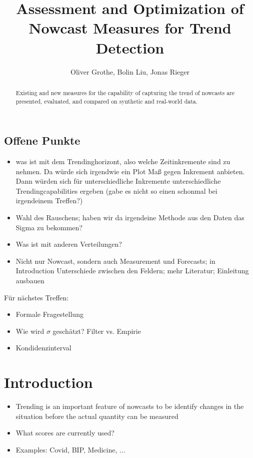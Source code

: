 \documentclass[oneside]{article}
\title{Assessment and Optimization of Nowcast Measures for Trend Detection}
\author{Oliver Grothe, Bolin Liu, Jonas Rieger}
\theoremstyle{plain}%
\theoremstyle{definition}
\begin{document}
\maketitle

\begin{abstract}
Existing and new measures for the capability of capturing the trend of nowcasts are presented, evaluated, and compared on synthetic and real-world data.
\end{abstract}

\subsection*{Offene Punkte}

\begin{itemize}
    \item was ist mit dem Trendinghorizont, also welche Zeitinkremente sind zu nehmen. Da würde sich irgendwie ein Plot Maß gegen Inkrement anbieten. Dann würden sich für unterschiedliche Inkremente unterschiedliche Trendingcapabilities ergeben (gabe es nicht so einen schonmal bei irgendeinem Treffen?)
    \item Wahl des Rauschens; haben wir da irgendeine Methode aus den Daten das Sigma zu bekommen?
    \item Was ist mit anderen Verteilungen?
    \item Nicht nur Nowcast, sondern auch Measurement und Forecasts; in Introduction Unterschiede zwischen den Feldern; mehr Literatur; Einleitung ausbauen
\end{itemize}

Für nächstes Treffen:
\begin{itemize}
    \item Formale Fragestellung
    \item Wie wird $\sigma$ geschätzt? Filter vs. Empirie
    \item Kondidenzinterval     
\end{itemize}


\listoftodos


\section{Introduction}

\begin{itemize}
	\item Trending is an important feature of nowcasts to be identify changes in the situation before the actual quantity can be measured
	\item What scores are currently used?
	\item Examples: Covid, BIP, Medicine, ... 
\end{itemize}
\end{document}
